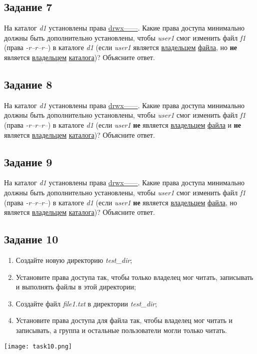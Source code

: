 \documentclass[12pt, a4paper]{report}
\begin{document}
	\subsection*{Задание 7}
	На каталог \textit{d1} установлены права \underline{drwx------}. Какие права доступа минимально должны быть дополнительно установлены, чтобы \textit{user1} смог изменить файл \textit{f1} (права \textit{-r--r--r--}) в каталоге \textit{d1} (если \textit{user1} является \underline{владельцем} \underline{файла}, но \textbf{не} является \underline{владельцем} \underline{каталога})? Объясните ответ.

	\subsection*{Задание 8}
	На каталог \textit{d1} установлены права \underline{drwx------}. Какие права доступа минимально должны быть дополнительно установлены, чтобы \textit{user1} смог изменить файл \textit{f1} (права \textit{-r--r--r--}) в каталоге \textit{d1} (если \textit{user1} \textbf{не} является \underline{владельцем} \underline{файла} и \textbf{не} является \underline{владельцем} \underline{каталога})? Объясните ответ.

	\subsection*{Задание 9}
	На каталог \textit{d1} установлены права \underline{drwx------}. Какие права доступа минимально должны быть дополнительно установлены, чтобы \textit{user1} смог изменить файл \textit{f1} (права \textit{-r--r--r--}) в каталоге \textit{d1} (если \textit{user1} \textbf{не} является \underline{владельцем} \underline{файла}, но является \underline{владельцем} \underline{каталога})? Объясните ответ.

	\subsection*{Задание 10}
	\begin{enumerate}
		\item Создайте новую директорию \textit{test\_dir};
		\item Установите права доступа так, чтобы только владелец мог читать, записывать и выполнять файлы в этой директории;
		\item Создайте файл \textit{file1.txt} в директории \textit{test\_dir};
		\item Установите права доступа для файла так, чтобы владелец мог читать и записывать, а группа и остальные пользователи могли только читать.
	\end{enumerate}
	\lstset{style=mystyle}
	
	\begin{center}
		\texttt{[image: task10.png]}
	\end{center}
\end{document}
